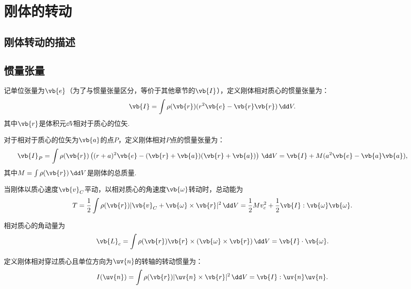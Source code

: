 \chapter{刚体的转动}

\newcommand{\sn}{\operatorname{sn}}
\newcommand{\cn}{\operatorname{cn}}
\newcommand{\dn}{\operatorname{dn}}
\section{刚体转动的描述}
\section{惯量张量}
记单位张量为\(\vb{e}\)（为了与惯量张量区分，等价于其他章节的\(\vb{I}\)），定义刚体相对质心的惯量张量为：
\begin{align*}
	\vb{I} = \int \rho(\vb{r}) (r^2 \vb{e} - \vb{r} \vb{r}) \, \dd V.
\end{align*}
其中\(\vb{r}\)是体积元\(\dd V\)相对于质心的位矢.

对于相对于质心的位矢为\(\vb{a}\)的点\(P\)，定义刚体相对\(P\)点的惯量张量为：
\begin{align*}
	\vb{I}_P = \int \rho(\vb{r}) \left((r + a)^2 \vb{e} - (\vb{r} + \vb{a})(\vb{r} + \vb{a})\right) \, \dd V = \vb{I} + M (a^2 \vb{e} - \vb{a} \vb{a}),
\end{align*}
其中\(M = \int \rho(\vb{r}) \, \dd V\)是刚体的总质量.

当刚体以质心速度\(\vb{v}_C\)平动，以相对质心的角速度\(\vb{\omega}\)转动时，总动能为
\begin{align*}
	T = \frac{1}{2} \int \rho(\vb{r}) |\vb{v}_C + \vb{\omega} \times \vb{r}|^2 \, \dd V = \frac{1}{2} M v_c^2 + \frac{1}{2} \vb{I} : \vb{\omega} \vb{\omega}.
\end{align*}

相对质心的角动量为
\begin{align*}
	\vb{L}_c = \int \rho(\vb{r}) \vb{r} \times (\vb{\omega} \times \vb{r}) \, \dd V = \vb{I} \cdot \vb{\omega}.
\end{align*}

定义刚体相对穿过质心且单位方向为\(\uv{n}\)的转轴的转动惯量为：
\begin{align*}
	I(\uv{n}) = \int \rho(\vb{r}) |\uv{n} \times \vb{r}|^2 \, \dd V = \vb{I} : \uv{n} \uv{n}.
\end{align*}

